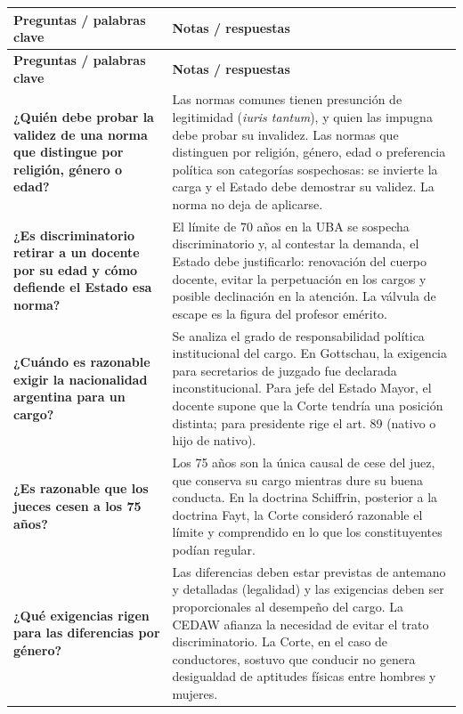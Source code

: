 \documentclass[12pt,oneside]{book}
\begin{document}
\begin{longtable}{
    >{\raggedright\arraybackslash}p{}
    !{\vrule width 0.4pt}
    >{\raggedright\arraybackslash}p{\tabcolsep-0.4pt\relax}
}
\toprule
\textbf{Preguntas / palabras clave} & \textbf{Notas / respuestas} \\
\midrule
\endfirsthead
\toprule
\textbf{Preguntas / palabras clave} & \textbf{Notas / respuestas} \\
\midrule
\endhead
\bottomrule
\endfoot
\bottomrule
\endlastfoot

\textbf{¿Quién debe probar la validez de una norma que distingue por religión, género o edad?} &
Las normas comunes tienen presunción de legitimidad (\textit{iuris tantum}), y quien las impugna debe probar su invalidez. Las normas que distinguen por religión, género, edad o preferencia política son categorías sospechosas: se invierte la carga y el Estado debe demostrar su validez. La norma no deja de aplicarse. \\[0.6em]

\textbf{¿Es discriminatorio retirar a un docente por su edad y cómo defiende el Estado esa norma?} &
El límite de 70 años en la UBA se sospecha discriminatorio y, al contestar la demanda, el Estado debe justificarlo: renovación del cuerpo docente, evitar la perpetuación en los cargos y posible declinación en la atención. La válvula de escape es la figura del profesor emérito. \\[0.6em]

\textbf{¿Cuándo es razonable exigir la nacionalidad argentina para un cargo?} &
Se analiza el grado de responsabilidad política institucional del cargo. En Gottschau, la exigencia para secretarios de juzgado fue declarada inconstitucional. Para jefe del Estado Mayor, el docente supone que la Corte tendría una posición distinta; para presidente rige el art. 89 (nativo o hijo de nativo). \\[0.6em]

\textbf{¿Es razonable que los jueces cesen a los 75 años?} &
Los 75 años son la única causal de cese del juez, que conserva su cargo mientras dure su buena conducta. En la doctrina Schiffrin, posterior a la doctrina Fayt, la Corte consideró razonable el límite y comprendido en lo que los constituyentes podían regular. \\[0.6em]

\textbf{¿Qué exigencias rigen para las diferencias por género?} &
Las diferencias deben estar previstas de antemano y detalladas (legalidad) y las exigencias deben ser proporcionales al desempeño del cargo. La CEDAW afianza la necesidad de evitar el trato discriminatorio. La Corte, en el caso de conductores, sostuvo que conducir no genera desigualdad de aptitudes físicas entre hombres y mujeres. \\


\end{longtable}
\end{document}

